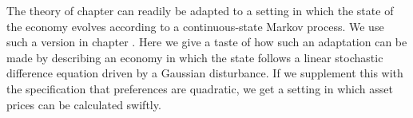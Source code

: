 








 The theory  of chapter 
can readily be adapted to a setting in which
the state of the economy evolves according to a continuous-state
 Markov process.   We use such a version in chapter .
Here we give a taste of how  such an adaptation can be made
by describing an economy in which the state follows a linear stochastic
difference equation driven by a Gaussian  disturbance.  If we supplement
this with the specification that preferences are quadratic,
we get a setting in which asset prices can be calculated swiftly.




